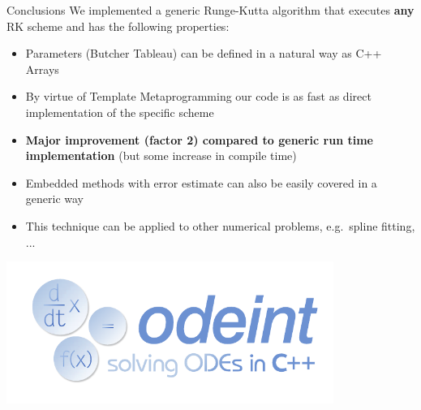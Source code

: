 \documentclass{beamer}
\begin{document}
\begin{frame}{Conclusions}
We implemented a generic Runge-Kutta algorithm that executes \textbf{any} RK scheme and has the following properties:
\begin{itemize}
 \item Parameters (Butcher Tableau) can be defined in a natural way as C++ Arrays
 \item By virtue of Template Metaprogramming our code is as fast as direct implementation of the specific scheme
 \item \textbf{Major improvement (factor 2) compared to generic run time implementation} (but some increase in compile time)
 \item Embedded methods with error estimate can also be easily covered in a generic way
 \item This technique can be applied to other numerical problems, e.g.\ spline fitting, ...
\end{itemize}

\end{frame}

\begin{frame}

\begin{center}
\includegraphics[width=0.8\textwidth]{../odeint_logo.pdf}
\end{center}
 
\end{frame}
\end{document}
